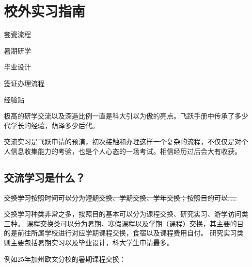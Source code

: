 \chapter{校外实习指南}
\begin{introduction}
\item 套瓷流程
\item 暑期研学
\item 毕业设计
\item 签证办理流程
\item 经验贴
\end{introduction}

极高的研学交流以及深造比例一直是科大引以为傲的亮点。飞跃手册中传承了多少代学长的经验，荫泽多少后代。

交流实习是飞跃申请的预演，初次接触和办理这样一个复杂的流程，不仅仅是对个人信息收集能力的考验，也是个人心态的一场考试。相信经历过后会大有收获。


\section{交流学习是什么？}

\sout{交换学习按照时间可以分为短期交换、学期交换、学年交换；按照目的可以……}

交换学习种类非常之多，按照目的基本可以分为课程交换、研究实习、游学访问类三种。
课程交换类可以分为暑期、寒假课程以及学期（课程）交换，其主要的目的是前往所属学校进行对应学期课程交换，食宿以及课程费用自付。
研究实习类则主要包括暑期实习以及毕业设计，科大学生申请最多。

例如25年加州欧文分校的暑期课程交换：

